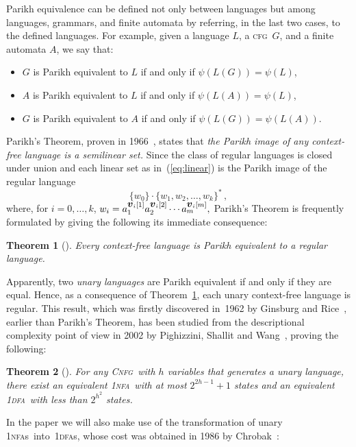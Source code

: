 \documentclass[11pt]{article}
\newcommand*{\ow}{\textsc{1}}
\newcommand*{\owdfa}{\ow\textsc{dfa}}
\newcommand*{\owdfas}{\ow\textsc{dfa}s}
\newcommand*{\ownfa}{\ow\textsc{nfa}}
\newcommand*{\ownfas}{\ow\textsc{nfa}s}
\newcommand*{\cfg}{\textsc{cfg}}
\newcommand*{\cnfg}{\textsc{Cnfg}}
\def\Vec#1{\mbox{\boldmath $#1$}}
\newtheorem{theorem}{Theorem}[section]
\begin{document}
Parikh equivalence can be defined not only between languages but among languages, grammars, and finite automata by referring,
in the last two cases, to the defined languages.
For example, given a language $L$, a \cfg\ $G$, and a finite automata $A$, we say that:
\begin{itemize}
\item $G$ is Parikh equivalent to $L$ if and only if $\psi(L(G)) = \psi(L)$,
\item $A$ is Parikh equivalent to $L$ if and only if $\psi(L(A)) = \psi(L)$,
\item $G$ is Parikh equivalent to $A$ if and only if $\psi(L(G)) = \psi(L(A))$.
\end{itemize}
Parikh's Theorem, proven in 1966~\cite{Parikh1966}, states that \emph{the Parikh image of any context-free language is a semilinear set.} 
Since the class of regular languages is closed under union and each linear set as in~(\ref{eq:linear}) is the Parikh image of 
the regular language
\[
\{w_0\}\cdot\{w_1,w_2,\ldots,w_k\}^*\,,
\]
where, for $i=0,\ldots,k$,
$
w_i = a_1^{\Vec{v}_i[1]}a_2^{\Vec{v}_i[2]}\cdots a_m^{\Vec{v}_i[m]},
$
Parikh's Theorem is frequently formulated by giving the following its immediate consequence:

\begin{theorem}[\cite{Parikh1966}]\label{thm:Parikh}
	Every context-free language is Parikh equivalent to a regular language. 
\end{theorem}

Apparently, two \emph{unary languages} are Parikh equivalent if and only if they are equal.
Hence, as a consequence of Theorem~\ref{thm:Parikh}, each unary context-free language is regular.
This result, which was firstly discovered in~1962 by Ginsburg and Rice~\cite{GinsburgRice1962},
earlier than Parikh's Theorem, has been studied from the descriptional
complexity point of view in 2002 by Pighizzini, Shallit and Wang~\cite{PighizziniShallitWang2002}, 
proving the following:


\begin{theorem}[{\cite[Thms.~4, 6]{PighizziniShallitWang2002}}]\label{thm:PSW2002}
	For any \cnfg\ with $h$ variables that generates a unary language, there exist an 
	equivalent \ownfa\ with at most $2^{2h-1}+1$ states and an equivalent \owdfa\  
	with less than $2^{h^2}$ states. 
\end{theorem}

In the paper we will also make use of the transformation of unary \ownfas\ into~\owdfas, whose
cost was obtained in 1986 by Chrobak~\cite{Chrobak1986}:
\end{document}
